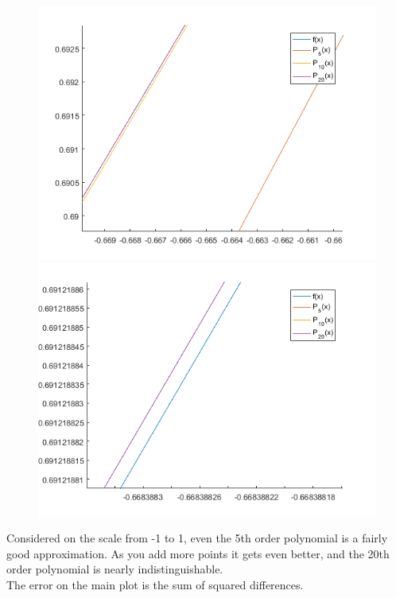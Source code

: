 \documentclass{article}
\begin{document}
\begin{center}
  \begin{figure}[h!]
    \includegraphics[width=\linewidth]{figures/question4-2}
    \endminipage\hfill
    \includegraphics[width=\linewidth]{figures/question4-3}
    \endminipage
  \end{figure}
\end{center}
Considered on the scale from -1 to 1, even the 5th order polynomial is
a fairly good approximation. As you add more points it gets even
better, and the 20th order polynomial is nearly indistinguishable.\\
The error on the main plot is the sum of squared differences.
\end{document}
